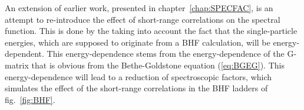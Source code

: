 An extension of earlier work, presented in chapter~\ref{chap:SPECFAC}, is an 
attempt to re-introduce the effect of short-range correlations on the spectral 
function. This is done by the taking into account the fact that the 
single-particle energies, which are supposed to originate from a BHF 
calculation, will be energy-dependent.
This energy-dependence stems from the energy-dependence of the G-matrix 
that is obvious from the Bethe-Goldstone equation (\ref{eq:BGEG}). 
This energy-dependence will lead to a reduction of spectroscopic factors, 
which simulates the effect of the short-range correlations in the BHF ladders 
of fig.~\ref{fig:BHF}.
